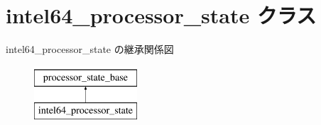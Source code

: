 \hypertarget{classintel64__processor__state}{}\section{intel64\+\_\+processor\+\_\+state クラス}
\label{classintel64__processor__state}
intel64\+\_\+processor\+\_\+state の継承関係図\begin{figure}[H]
\begin{center}
\leavevmode
\includegraphics[height=2.000000cm]{classintel64__processor__state}
\end{center}
\end{figure}
